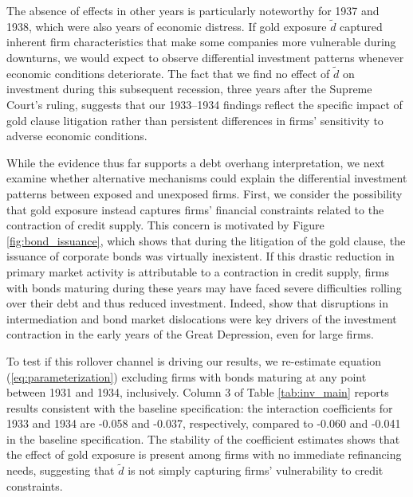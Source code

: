 The absence of effects in other years is particularly noteworthy for 1937 and 1938, which were also years of economic distress. If gold exposure $\tilde{d}$ captured inherent firm characteristics that make some companies more vulnerable during downturns, we would expect to observe differential investment patterns whenever economic conditions deteriorate. The fact that we find no effect of $\tilde{d}$ on investment during this subsequent recession, three years after the Supreme Court's ruling, suggests that our 1933--1934 findings reflect the specific impact of gold clause litigation rather than persistent differences in firms' sensitivity to adverse economic conditions. 

While the evidence thus far supports a debt overhang interpretation, we next examine whether alternative mechanisms could explain the differential investment patterns between exposed and unexposed firms. First, we consider the possibility that gold exposure instead captures firms' financial constraints related to the contraction of credit supply. This concern is motivated by Figure \ref{fig:bond_issuance}, which shows that during the litigation of the gold clause, the issuance of corporate bonds was virtually inexistent. If this drastic reduction in primary market activity is attributable to a contraction in credit supply, firms with bonds maturing during these years may have faced severe difficulties rolling over their debt and thus reduced investment. Indeed, \cite{Benmelech2018} show that disruptions in intermediation and bond market dislocations were key drivers of the investment contraction in the early years of the Great Depression, even for large firms. 

To test if this rollover channel is driving our results, we re-estimate equation (\ref{eq:parameterization}) excluding firms with bonds maturing at any point between 1931 and 1934, inclusively. Column 3 of Table \ref{tab:inv_main} reports results consistent with the baseline specification: the interaction coefficients for 1933 and 1934 are -0.058 and -0.037, respectively, compared to -0.060 and -0.041 in the baseline specification. The stability of the coefficient estimates shows that the effect of gold exposure is present among firms with no immediate refinancing needs, suggesting that $\tilde{d}$ is not simply capturing firms' vulnerability to credit constraints.

